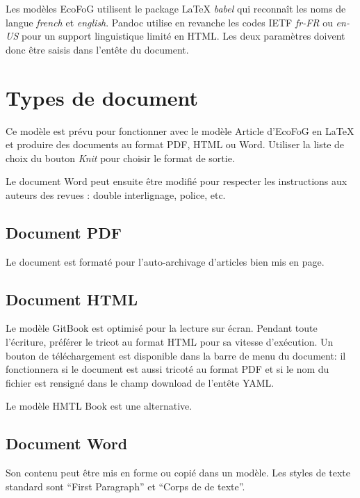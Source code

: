 \documentclass[fleqn,10pt]{latex/stylish_article} %
\begin{document}
Les modèles EcoFoG utilisent le package LaTeX \emph{babel} qui reconnaît les noms de langue \emph{french} et \emph{english}.
Pandoc utilise en revanche les codes IETF \emph{fr-FR} ou \emph{en-US} pour un support linguistique limité en HTML.
Les deux paramètres doivent donc être saisis dans l'entête du document.

\hypertarget{types-de-document}{%
\section{Types de document}\label{types-de-document}}

Ce modèle est prévu pour fonctionner avec le modèle Article d'EcoFoG en LaTeX et produire des documents au format PDF, HTML ou Word.
Utiliser la liste de choix du bouton \emph{Knit} pour choisir le format de sortie.

Le document Word peut ensuite être modifié pour respecter les instructions aux auteurs des revues : double interlignage, police, etc.

\hypertarget{document-pdf}{%
\subsection{Document PDF}\label{document-pdf}}

Le document est formaté pour l'auto-archivage d'articles bien mis en page.

\hypertarget{document-html}{%
\subsection{Document HTML}\label{document-html}}

Le modèle GitBook est optimisé pour la lecture sur écran.
Pendant toute l'écriture, préférer le tricot au format HTML pour sa vitesse d'exécution.
Un bouton de téléchargement est disponible dans la barre de menu du document: il fonctionnera si le document est aussi tricoté au format PDF et si le nom du fichier est rensigné dans le champ download de l'entête YAML.

Le modèle HMTL Book est une alternative.

\hypertarget{document-word}{%
\subsection{Document Word}\label{document-word}}

Son contenu peut être mis en forme ou copié dans un modèle.
Les styles de texte standard sont ``First Paragraph'' et ``Corps de de texte''.
\end{document}
